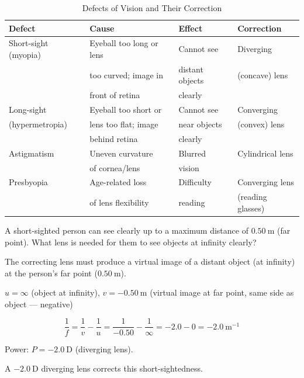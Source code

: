\begin{diagbox}
\begin{center}
\begin{tikzpicture}[scale=0.9, font=\small]
\end{tikzpicture}
\end{center}
\end{diagbox}

\begin{table}[H]
\centering
\caption{Defects of Vision and Their Correction}
\label{tab:vision_defects}
\begin{tabular}{llll}
\toprule
\textbf{Defect} & \textbf{Cause} & \textbf{Effect} &
\textbf{Correction}\\
\midrule
Short-sight (myopia) &
  Eyeball too long or lens & Cannot see & Diverging
  \\
& too curved; image in & distant objects & (concave)
  lens\\
& front of retina & clearly & \\[4pt]
Long-sight &
  Eyeball too short or & Cannot see & Converging
  \\
(hypermetropia) &
  lens too flat; image & near objects & (convex) lens
  \\
& behind retina & clearly & \\[4pt]
Astigmatism &
  Uneven curvature & Blurred & Cylindrical lens
  \\
& of cornea/lens & vision & \\[4pt]
Presbyopia &
  Age-related loss & Difficulty & Converging lens
  \\
& of lens flexibility & reading & (reading glasses)\\
\bottomrule
\end{tabular}
\end{table}

\begin{examplebox}[20.6]
A short-sighted person can see clearly up to a maximum
distance of $0.50\ \text{m}$ (far point). What lens is
needed for them to see objects at infinity clearly?
\end{examplebox}

\begin{solutionbox}
The correcting lens must produce a virtual image of
a distant object (at infinity) at the person's far
point ($0.50\ \text{m}$).

$u = \infty$ (object at infinity),
$v = -0.50\ \text{m}$ (virtual image at far point,
same side as object --- negative)

\[
  \frac{1}{f} = \frac{1}{v} - \frac{1}{u}
  = \frac{1}{-0.50} - \frac{1}{\infty}
  = -2.0 - 0 = -2.0\ \text{m}^{-1}
\]

Power: $P = -2.0\ \text{D}$ (diverging lens).

A $-2.0\ \text{D}$ diverging lens corrects this
short-sightedness.
\end{solutionbox}

